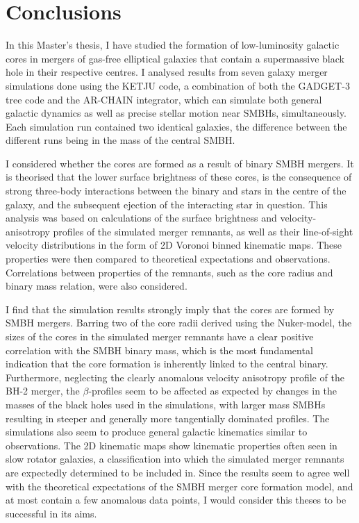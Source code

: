 \documentclass[english, twoside]{HYgradu}
\begin{document}
\begin{figure}
	\label{figure:profile_comparison}
\end{figure}


\chapter{Conclusions}

In this Master's thesis, I have studied the formation of low-luminosity galactic cores in mergers of gas-free elliptical galaxies that contain a supermassive black hole in their respective centres. I analysed results from seven galaxy merger simulations done using the KETJU code, a combination of both the GADGET-3 tree code and the AR-CHAIN integrator, which can simulate both general galactic dynamics as well as precise stellar motion near SMBHs, simultaneously. Each simulation run contained two identical galaxies, the difference between the different runs being in the mass of the central SMBH. 

I considered whether the cores are formed as a result of binary SMBH mergers. It is theorised that the lower surface brightness of these cores, is the consequence of strong three-body interactions between the binary and stars in the centre of the galaxy, and the subsequent ejection of the interacting star in question. This analysis was based on calculations of the surface brightness and velocity-anisotropy profiles of the simulated merger remnants, as well as their line-of-sight velocity distributions in the form of 2D Voronoi binned kinematic maps. These properties were then compared to theoretical expectations and observations. Correlations between properties of the remnants, such as the core radius and binary mass relation, were also considered.

I find that the simulation results strongly imply that the cores are formed by SMBH mergers. Barring two of the core radii derived using the Nuker-model, the sizes of the cores in the simulated merger remnants have a clear positive correlation with the SMBH binary mass, which is the most fundamental indication that the core formation is inherently linked to the central binary. Furthermore, neglecting the clearly anomalous velocity anisotropy profile of the BH-2 merger, the $\beta$-profiles seem to be affected as expected by changes in the masses of the black holes used in the simulations, with larger mass SMBHs resulting in steeper and generally more tangentially dominated profiles. The simulations also seem to produce general galactic kinematics similar to observations. The 2D kinematic maps show kinematic properties often seen in slow rotator galaxies, a classification into which the simulated merger remnants are expectedly determined to be included in. Since the results seem to agree well with the theoretical expectations of the SMBH merger core formation model, and at most contain a few anomalous data points, I would consider this theses to be successful in its aims.
\end{document}
